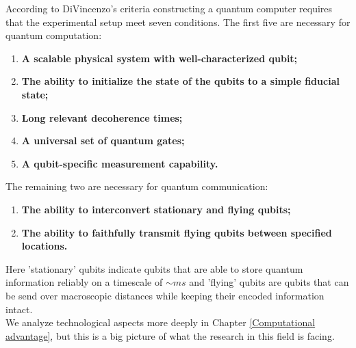 According to DiVincenzo's criteria constructing a quantum computer requires that the experimental setup meet seven conditions. The first five are necessary for quantum computation:
\begin{enumerate}
    \item \textbf{A scalable physical system with well-characterized qubit;}
    \item \textbf{The ability to initialize the state of the qubits to a simple fiducial state;}
    \item \textbf{Long relevant decoherence times;}
    \item \textbf{A universal set of quantum gates;}
    \item \textbf{A qubit-specific measurement capability.}
\end{enumerate}
The remaining two are necessary for quantum communication:
\begin{enumerate}
    \item \textbf{The ability to interconvert stationary and flying qubits;}
    \item \textbf{The ability to faithfully transmit flying qubits between specified locations.}
\end{enumerate}
Here 'stationary' qubits indicate qubits that are able to store quantum information reliably on a timescale of $\sim ms$ and 'flying' qubits are qubits that can be send over macroscopic distances while keeping their encoded information intact. \\
We analyze technological aspects more deeply in Chapter \ref{Computational advantage}, but this is a big picture of what the research in this field is facing.

